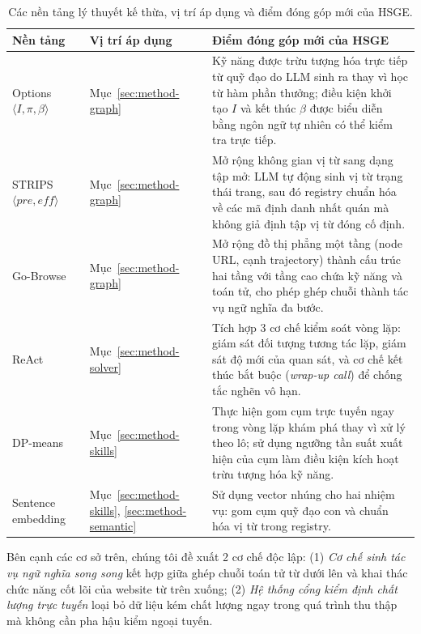 \begin{table}[htbp]
  \centering
  \caption[Nền tảng kế thừa và điểm mới của HSGE]{Các nền tảng lý thuyết kế thừa, vị trí áp dụng và điểm đóng góp mới của HSGE.}
  \label{tab:novelty}
  \small
  \begin{tabular}{@{}L{3.0cm} L{2.4cm} L{7.6cm}@{}}
    \toprule
    \textbf{Nền tảng} & \textbf{Vị trí áp dụng} & \textbf{Điểm đóng góp mới của HSGE} \\
    \midrule
    Options $\langle I, \pi, \beta \rangle$~\cite{sutton1999options} &
    Mục~\ref{sec:method-graph} &
    Kỹ năng được trừu tượng hóa trực tiếp từ quỹ đạo do LLM sinh ra thay vì học từ hàm phần thưởng; điều kiện khởi tạo $I$ và kết thúc $\beta$ được biểu diễn bằng ngôn ngữ tự nhiên có thể kiểm tra trực tiếp. \\
    \addlinespace
    STRIPS $\langle \mathit{pre}, \mathit{eff} \rangle$~\cite{fikes1971strips} &
    Mục~\ref{sec:method-graph} &
    Mở rộng không gian vị từ sang dạng tập mở: LLM tự động sinh vị từ trạng thái trang, sau đó registry chuẩn hóa về các mã định danh nhất quán mà không giả định tập vị từ đóng cố định. \\
    \addlinespace
    Go-Browse~\cite{gandhi2026gobrowse} &
    Mục~\ref{sec:method-graph} &
    Mở rộng đồ thị phẳng một tầng (node URL, cạnh trajectory) thành cấu trúc hai tầng với tầng cao chứa kỹ năng và toán tử, cho phép ghép chuỗi thành tác vụ ngữ nghĩa đa bước. \\
    \addlinespace
    ReAct~\cite{yao2023react} &
    Mục~\ref{sec:method-solver} &
    Tích hợp 3 cơ chế kiểm soát vòng lặp: giám sát đối tượng tương tác lặp, giám sát độ mới của quan sát, và cơ chế kết thúc bắt buộc (\textit{wrap-up call}) để chống tắc nghẽn vô hạn. \\
    \addlinespace
    DP-means~\cite{kulis2012dpmeans} &
    Mục~\ref{sec:method-skills} &
    Thực hiện gom cụm trực tuyến ngay trong vòng lặp khám phá thay vì xử lý theo lô; sử dụng ngưỡng tần suất xuất hiện của cụm làm điều kiện kích hoạt trừu tượng hóa kỹ năng. \\
    \addlinespace
    Sentence embedding~\cite{reimers2019sbert} &
    Mục~\ref{sec:method-skills}, \ref{sec:method-semantic} &
    Sử dụng vector nhúng cho hai nhiệm vụ: gom cụm quỹ đạo con và chuẩn hóa vị từ trong registry. \\
    \bottomrule
  \end{tabular}
\end{table}

Bên cạnh các cơ sở trên, chúng tôi đề xuất 2 cơ chế độc lập: (1) \textit{Cơ chế sinh tác vụ ngữ nghĩa song song} kết hợp giữa ghép chuỗi toán tử từ dưới lên và khai thác chức năng cốt lõi của website từ trên xuống; (2) \textit{Hệ thống cổng kiểm định chất lượng trực tuyến} loại bỏ dữ liệu kém chất lượng ngay trong quá trình thu thập mà không cần pha hậu kiểm ngoại tuyến.


